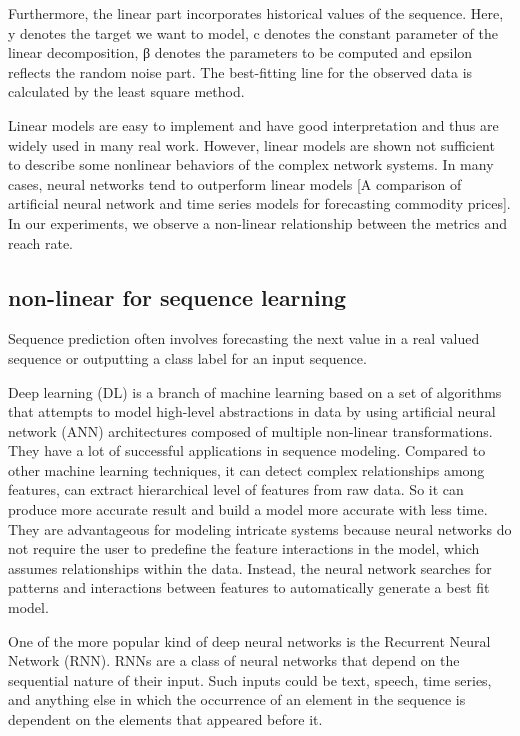 \documentclass[5p]{elsarticle}
\newcommand{\dabiaolv}{reach rate}
\begin{document}
Furthermore, the linear part incorporates historical values of the sequence. Here, y denotes the target we want to model, c denotes the constant parameter of the linear decomposition, β denotes the parameters to be computed and epsilon reflects the random noise part. The best-fitting line for the observed data is calculated by the least square method.


Linear models are easy to implement and have good interpretation and thus are widely used in many real work. However, linear models are shown not sufficient to describe some nonlinear behaviors of the complex network systems. In many cases, neural networks tend to outperform linear models [A comparison of artificial neural network and time series models for forecasting commodity prices]. In our experiments, we observe a non-linear relationship between the metrics and \dabiaolv.


\subsection{non-linear for sequence learning}
Sequence prediction often involves forecasting the next value in a real valued sequence or outputting a class label for an input sequence.

Deep learning (DL) is a branch of machine learning based on a set of algorithms that attempts to model high-level abstractions in data by using artificial neural network (ANN) architectures composed of multiple non-linear transformations. They have a lot of successful applications in sequence modeling. Compared to other machine learning techniques, it can detect complex relationships among features, can extract hierarchical level of features from raw data. So it can produce more accurate result and build a model more accurate with less time. They are advantageous for modeling intricate systems because neural networks do not require the user to predefine the feature interactions in the model, which assumes relationships within the data. Instead, the neural network searches for patterns and interactions between features to automatically generate a best fit model.

One of the more popular kind of deep neural networks is the Recurrent Neural Network (RNN). RNNs are a class of neural networks that depend on the sequential nature of their input. Such inputs could be text, speech, time series, and anything else in which the occurrence of an element in the sequence is dependent on the elements that appeared before it.
\end{document}
